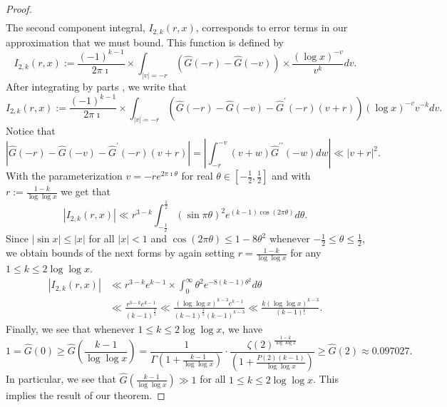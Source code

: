 \documentclass[11pt,reqno,a4letter]{article}
\numberwithin{figure}{section}
\numberwithin{table}{section}
\newcommand{\cf}{\textit{cf.\ }}
\theoremstyle{plain}
\numberwithin{theorem}{section}
\theoremstyle{definition}
\begin{document}
\begin{proof}
\begin{align*}
\end{align*}
The second component integral, $I_{2,k}(r, x)$, corresponds to error terms in our approximation 
that we must bound. This function is defined by 
\[
I_{2,k}(r, x) := \frac{(-1)^{k-1}}{2\pi\imath} \times \int_{|v|=-r} 
     \left(\widehat{G}(-r) - \widehat{G}(-v)\right) 
     \times \frac{(\log x)^{-v}}{v^k} dv. 
\]
After integrating by parts \cite[\cf Thm.\ 7.19; \S 7.4]{MV}, we write that 
\[
I_{2,k}(r, x) := \frac{(-1)^{k-1}}{2\pi\imath} \times \int_{|v|=-r} 
     \left(\widehat{G}(-r) - \widehat{G}(-v) - 
     \widehat{G}^{\prime}(-r)(v+r)\right) 
     (\log x)^{-v} v^{-k} dv. 
\]
Notice that 
\[
\left\lvert \widehat{G}(-r) - \widehat{G}(-v) - \widehat{G}^{\prime}(-r)(v+r) \right\rvert = 
     \left\lvert \int_{-r}^{-v} 
     (v+w) \widehat{G}^{\prime\prime}(-w) dw \right\rvert 
     \ll |v+r|^2. 
\]
With the parameterization $v = -re^{2\pi\imath\theta}$ for real 
$\theta \in \left[-\frac{1}{2}, \frac{1}{2}\right]$ and 
with $r := \frac{1-k}{\log\log x}$ 
we get that 
\[
|I_{2,k}(r, x)| \ll r^{3-k} \int_{-\frac{1}{2}}^{\frac{1}{2}} (\sin \pi\theta)^2 e^{(k-1) \cos(2\pi\theta)} d\theta. 
\]
Since $|\sin x| \leq |x|$ for all $|x| < 1$ and $\cos(2\pi\theta) \leq 1 - 8\theta^2$ whenever 
$-\frac{1}{2} \leq \theta \leq \frac{1}{2}$, we obtain bounds of the next forms by again 
setting $r = \frac{1-k}{\log\log x}$ for any $1 \leq k \leq 2\log\log x$. 
\begin{align*}
|I_{2,k}(r, x)| & \ll r^{3-k} e^{k-1} \times \int_0^{\infty} \theta^2 e^{-8(k-1) \theta^2} d\theta \\ 
     & \ll \frac{r^{3-k} e^{k-1}}{(k-1)^{\frac{3}{2}}} \ll 
     \frac{(\log\log x)^{k-3} e^{k-1}}{(k-1)^{\frac{3}{2}} (k-1)^{k-3}} 
     \ll 
     \frac{k (\log\log x)^{k-3}}{(k-1)!}. 
\end{align*}
Finally, we see that whenever $1 \leq k \leq 2\log\log x$, we have 
\[
1 = \widehat{G}(0) \geq \widehat{G}\left(\frac{k-1}{\log\log x}\right) = 
     \frac{1}{\Gamma\left(1+\frac{k-1}{\log\log x}\right)} \cdot 
     \frac{\zeta(2)^{\frac{1-k}{\log\log x}}}{\left(1+\frac{P(2)(k-1)}{\log\log x}\right)} 
     \geq \widehat{G}(2) \approx 0.097027. 
\]
In particular, we see that $\widehat{G}\left(\frac{k-1}{\log\log x}\right) \gg 1$ for 
all $1 \leq k \leq 2\log\log x$. 
This implies the result of our theorem. 
\end{proof} 
\end{document}
